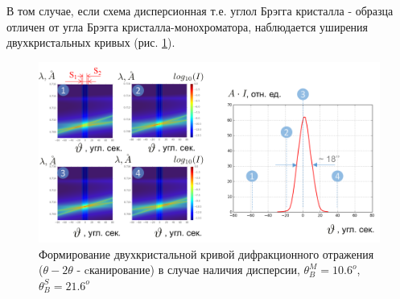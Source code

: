 В том случае, если схема дисперсионная т.е. углол Брэгга кристалла - образца отличен от угла Брэгга кристалла-монохроматора,
наблюдается уширения двухкристальных кривых (рис. \ref{ris:double_crystal_form_kdo_dissp}).
 \begin{figure}[H]
   \centering
   \includegraphics[width=1\textwidth]{images/double_crystal_form_kdo_dissp.png}
   \caption{Формирование двухкристальной кривой дифракционного отражения ($\theta - 2\theta$ - cканирование) в случае
   наличия дисперсии, $\theta_B^M = 10.6^o$, $\theta_B^S = 21.6^o$ }
   \label{ris:double_crystal_form_kdo_dissp}
 \end{figure}
